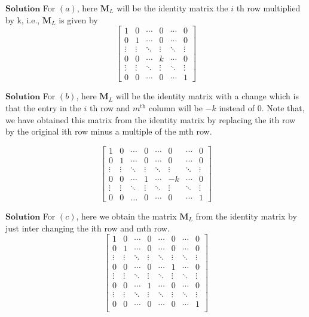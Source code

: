 \documentclass{styles/kaobook}
\begin{document}
$\boxed{\textbf{Solution}}$  For $(a)$, here $\mathbf{M}_{L}$ will be the identity matrix the $i$ th row multiplied by k, i.e., $\mathbf{M}_{L}$ is given by
$$\begin{bmatrix}{1} & {0} & {\cdots} & {0} & {\cdots} & {0} \\ {0} & {1} & {\cdots} & {0} & {\cdots} & {0} \\ {\vdots} & {\vdots} & {\ddots} & {\vdots} & {\ddots} & {\vdots} \\ {0} & {0} & {\cdots} & {k} & {\cdots} & {0} \\ {\vdots} & {\vdots} & {\ddots} & {\vdots} & {\ddots} & {\vdots} \\ {0} & {0} & {\cdots} & {0} & {\cdots} & {1}\end{bmatrix}$$




$\boxed{\textbf{Solution}}$  For $(b)$, here $\mathbf{M}_{L}$ will be the identity matrix with a change which is that the entry in the $i$ th row and $m^{\text{th}}$ column will be $-k$ instead of $0$. Note that, we have obtained this matrix from the identity matrix by replacing the ith row by the original ith row minus a multiple of the mth row.

$$\begin{bmatrix}
1 & 0 & \cdots & 0 & \cdots & 0&\cdots&0 \\ 
0 & 1 & \cdots  & 0 & \cdots &0&\cdots& 0\\ 
\vdots & \vdots & \ddots & \vdots & \ddots &\vdots&\ddots &\vdots\\ 
0 & 0 & \cdots & 1 &\cdots & -k &\cdots &0 \\ 
\vdots & \vdots & \ddots & \vdots  &\ddots &\vdots &\ddots &\vdots\\
0&0&\dots&0&\cdots&0&\cdots&1
\end{bmatrix}$$




$\boxed{\textbf{Solution}}$  For $(c)$, here we obtain the matrix $\mathbf{M}_{L}$ from the identity matrix by just inter changing the ith row and mth row.
$$\begin{bmatrix}
1& 0  &\cdots  & 0 & \cdots & 0 & \cdots &0 \\ 
0&1  &\cdots  &0  & \cdots & 0 & \cdots & 0\\ 
\vdots& \vdots & \ddots & \vdots & \ddots & \vdots & \ddots& \vdots\\ 
0 & 0 & \cdots &0  &\cdots  & 1 & \cdots & 0\\ 
 \vdots& \vdots & \ddots & \vdots & \ddots & \vdots & \ddots& \vdots\\ 
0 & 0 & \cdots &1  &\cdots  & 0 & \cdots & 0\\ 
 \vdots& \vdots & \ddots & \vdots & \ddots & \vdots & \ddots& \vdots\\  
0 & 0 & \cdots &0  &\cdots  & 0 & \cdots & 1\\ 
\end{bmatrix}$$
\end{document}
